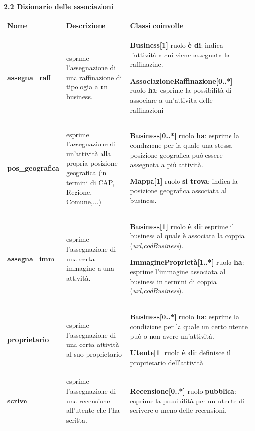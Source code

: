 \documentclass[a4paper,12pt]{article}
\begin{document}
\newpage\null{}\setcounter{page}{9}
\vspace{-2cm}
\begin{flushleft}
{\bf 2.2 Dizionario delle associazioni} 
\vspace{+1cm}
\begin{table}[htbp]
\begin{tabular}[c]{| m{3cm} | m{5cm} | m{7cm} |}
\hline
\bf Nome&\bf Descrizione&\bf Classi coinvolte\\
\hline
{\bf assegna\_raff}
&\small esprime l'assegnazione di una raffinazione di tipologia
a un business.
&\footnotesize
{\bf Business[1]} ruolo {\bf è di}: indica l'attività a cui viene 
assegnata la raffinazine.

{\bf AssociazioneRaffinazione[0..*]} ruolo {\bf ha}: esprime la possibilità di associare a un'attivita delle raffinazioni
\\
\hline

{\bf pos\_geografica}
&\small esprime l'assegnazione di un'attività alla propria posizione
geografica (in termini di CAP, Regione, Comune,...)
&\footnotesize
{\bf Business[0..*]} ruolo {\bf ha}: esprime la condizione per la quale
una stessa posizione geografica può essere assegnata a più attività.

{\bf Mappa[1]} ruolo {\bf si trova}: indica la posizione geografica
associata al business.
\\
\hline

{\bf assegna\_imm}
&\small esprime l'assegnazione di una certa immagine a una attività.
&\footnotesize
{\bf Business[1]} ruolo {\bf è di}: esprime il business al quale è
associata la coppia ({\it url,codBusiness}).

{\bf ImmagineProprietà[1..*]} ruolo {\bf ha}: esprime l'immagine associata
al business in termini di coppia ({\it url,codBusiness}).
\\
\hline

{\bf proprietario}
&\small esprime l'assegnazione di una certa attività al suo proprietario
&\footnotesize
{\bf Business[0..*]} ruolo {\bf ha}: esprime la condizione per la quale
un certo utente può o non avere un'attività.

{\bf Utente[1]} ruolo {\bf è di}: definisce il proprietario dell'attività.
\\
\hline

{\bf scrive}
&\small esprime l'assegnazione di una recensione all'utente che l'ha 
scritta.
&\footnotesize
{\bf Recensione[0..*]} ruolo {\bf pubblica}: esprime la possibilità per un
utente di scrivere o meno delle recensioni.


\end{tabular}
\end{table}
\end{flushleft}
\end{document}
